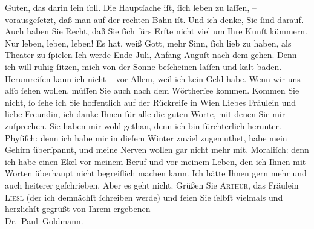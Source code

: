 \begin{ledgroupsized}[t]{13cm}
               Guten, das darin ſein ſoll. Die Hauptſache iſt, ſich leben zu laſſen, –
               vorausgeſetzt, daß man auf der rechten Bahn iſt. Und ich denke, Sie ſind darauf.\pend
           \pstart
           Auch haben Sie Recht, daß Sie ſich fürs Erſte nicht viel um Ihre Kunſt kümmern. Nur
               leben, leben, leben! Es hat, weiß Gott, mehr Sinn, ſich lieb zu haben, als Theater zu
                  ſpielen{\dotsfive}\pend
           \pstart
           Ich werde Ende Juli, Anfang Auguſt nach dem \label{K_L03528-2v}\label{K_L03528-2h}{ }{\pb}gehen. Denn ich will ruhig ſitzen, mich von der
               Sonne beſcheinen laſſen und kalt baden. Herumreiſen kann ich nicht – vor Allem, weil
               ich kein Geld habe. Wenn wir uns alſo ſehen wollen, müſſen Sie auch nach dem Wörtherſee kommen. Kommen Sie nicht, ſo ſehe ich
               Sie hoffentlich auf der Rückreiſe in Wien\pend
           \pstart
           Liebes Fräulein und liebe Freundin, ich danke Ihnen für alle die guten Worte, mit
               denen Sie mir zuſprechen. Sie haben mir wohl gethan, denn ich bin fürchterlich
               herunter. {\pb}Phyſiſch: denn ich habe mir in dieſem
               Winter zuviel zugemuthet, habe mein Gehirn überſpannt, und meine Nerven wollen gar
               nicht mehr mit. Moraliſch: denn ich habe einen Ekel vor meinem Beruf und vor meinem
               Leben, den ich Ihnen mit Worten überhaupt nicht begreiflich machen kann. Ich hätte
               Ihnen gern mehr und auch heiterer geſchrieben. Aber es geht nicht. Grüßen Sie \textsc{Arthur}, das Fräulein \textsc{Liesl} (der ich demnächſt ſchreiben werde) und ſeien Sie ſelbſt vielmals und
               herzlichſt gegrüßt von Ihrem ergebenen {\\}\spacefill\mbox{Dr. Paul Goldmann.}\pend
           
         
         \endnumbering{}\end{ledgroupsized}  \newcommand{\dateiname}{L03528}\newcommand{\titel}{Paul Goldmann an Olga Gussmann, 28. 5. [1901]}\newcommand{\editorInnen}{Martin Anton Müller und Laura Untner}
      